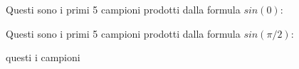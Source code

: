 

Questi sono i primi 5 campioni prodotti dalla formula $sin(0)$:





Questi sono i primi 5 campioni prodotti dalla formula $sin(\pi/2)$:



questi i campioni


